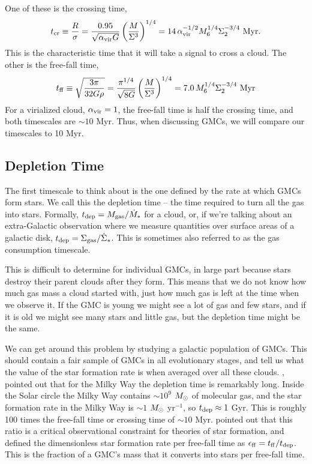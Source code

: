 One of these is the crossing time,
\begin{equation}
t_{\rm cr} \equiv \frac{R}{\sigma} = \frac{0.95}{\sqrt{\alpha_{\mathrm{vir}} G}} \left(\frac{M}{\Sigma^3}\right)^{1/4} = 14\, \alpha_{\mathrm{vir}}^{-1/2} M_6^{1/4} \Sigma_2^{-3/4}\mbox{ Myr}.
\end{equation}
This is the characteristic time that it will take a signal to cross a cloud. The other is the free-fall time,
\begin{equation}
t_{\rm ff} \equiv \sqrt{\frac{3\pi}{32 G \rho}} = \frac{\pi^{1/4}}{\sqrt{8G}}\left(\frac{M}{\Sigma^3}\right)^{1/4} = 
7.0\, M_6^{1/4} \Sigma_2^{-3/4}\mbox{ Myr}
\end{equation}
For a virialized cloud, $\alpha_{\mathrm{vir}}=1$, the free-fall time is half the crossing time, and both timescales are $\sim 10$ Myr. Thus, when discussing GMCs, we will compare our timescales to 10 Myr.

\subsection{Depletion Time}

The first timescale to think about is the one defined by the rate at which GMCs form stars. We call this the depletion time -- the time required to turn all the gas into stars. Formally, $t_{\rm dep} = M_{\rm gas}/\dot{M}_*$ for a cloud, or, if we're talking about an extra-Galactic observation where we measure quantities over surface areas of a galactic disk, $t_{\rm dep} = \Sigma_{\rm gas}/\dot{\Sigma}_*$. This is sometimes also referred to as the gas consumption timescale.

This is difficult to determine for individual GMCs, in large part because stars destroy their parent clouds after they form. This means that we do not know how much gas mass a cloud started with, just how much gas is left at the time when we observe it. If the GMC is young we might see a lot of gas and few stars, and if it is old we might see many stars and little gas, but the depletion time might be the same.

We can get around this problem by studying a galactic population of GMCs. This should contain a fair sample of GMCs in all evolutionary stages, and tell us what the value of the star formation rate is when averaged over all these clouds. \citet{zuckerman74a}, pointed out that for the Milky Way the depletion time is remarkably long. Inside the Solar circle the Milky Way contains $\sim 10^9$ $M_{\odot}$ of molecular gas, and the star formation rate in the Milky Way is $\sim 1$ $M_{\odot}$ yr$^{-1}$, so $t_{\rm dep}\approx 1$ Gyr. This is roughly 100 times the free-fall time or crossing time of $\sim 10$ Myr. \citet{krumholz05c} pointed out that this ratio is a critical observational constraint for theories of star formation, and defined the dimensionless star formation rate per free-fall time as $\epsilon_{\rm ff} = t_{\rm ff} / t_{\rm dep}$. This is the fraction of a GMC's mass that it converts into stars per free-fall time.

